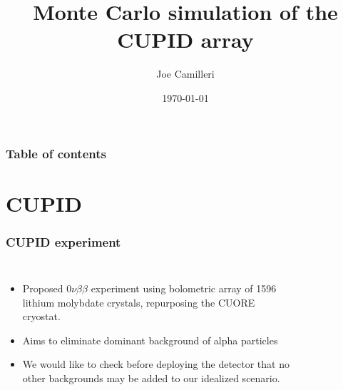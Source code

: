 \documentclass{beamer}
\title[CUPID array]{Monte Carlo simulation of the CUPID array} %
\author{Joe Camilleri} %
\institute[Virginia Tech] %
{
	DNP October 2021 \\ %
	\medskip
	\textit{jcamilleri@vt.edu} %
}
\date{\today} %
\begin{document}
	
	\begin{frame}
		\titlepage %
	\end{frame}
	
	\begin{frame}
		\frametitle{Table of contents} %
	\end{frame}
	
	
	\section{CUPID}
	\begin{frame}
		\frametitle{CUPID experiment}
		\begin{columns}[c] %
			
			\begin{itemize}
				\item Proposed $0\nu\beta\beta$ experiment using bolometric array of 1596 lithium molybdate crystals, repurposing the CUORE cryostat.
				\item Aims to eliminate dominant background of alpha particles
				\item We would like to check before deploying the detector that no other backgrounds may be added to our idealized scenario.
			\end{itemize}
			
			\begin{figure}
			\end{figure}
			
		\end{columns}
	\end{frame}
	
\end{document}
